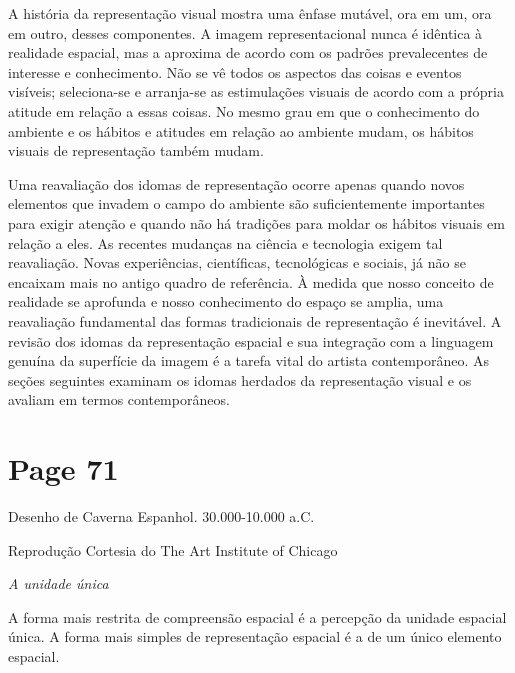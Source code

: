 \documentclass[a4paper]{article}
\begin{document}
A história da representação visual mostra uma ênfase mutável, ora em um, ora em outro, desses componentes. A imagem representacional nunca é idêntica à realidade espacial, mas a aproxima de acordo com os padrões prevalecentes de interesse e conhecimento. Não se vê todos os aspectos das coisas e eventos visíveis; seleciona-se e arranja-se as estimulações visuais de acordo com a própria atitude em relação a essas coisas. No mesmo grau em que o conhecimento do ambiente e os hábitos e atitudes em relação ao ambiente mudam, os hábitos visuais de representação também mudam.

Uma reavaliação dos idomas de representação ocorre apenas quando novos elementos que invadem o campo do ambiente são suficientemente importantes para exigir atenção e quando não há tradições para moldar os hábitos visuais em relação a eles. As recentes mudanças na ciência e tecnologia exigem tal reavaliação. Novas experiências, científicas, tecnológicas e sociais, já não se encaixam mais no antigo quadro de referência. À medida que nosso conceito de realidade se aprofunda e nosso conhecimento do espaço se amplia, uma reavaliação fundamental das formas tradicionais de representação é inevitável. A revisão dos idomas da representação espacial e sua integração com a linguagem genuína da superfície da imagem é a tarefa vital do artista contemporâneo. As seções seguintes examinam os idomas herdados da representação visual e os avaliam em termos contemporâneos.

\newpage
\section*{Page 71}

Desenho de Caverna Espanhol. 30.000-10.000 a.C.

Reprodução Cortesia do The Art Institute of Chicago

\textit{A unidade única}

A forma mais restrita de compreensão espacial é a percepção da unidade espacial única. A forma mais simples de representação espacial é a de um único elemento espacial.
\end{document}
